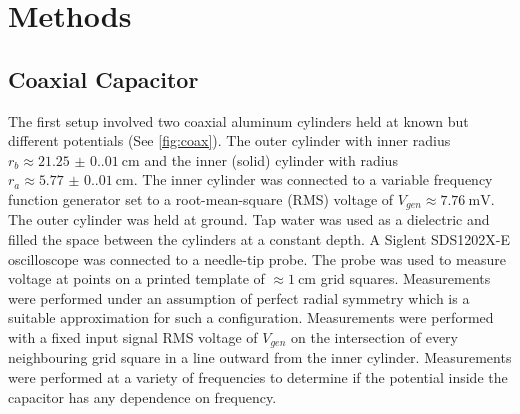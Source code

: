 \documentclass[10pt, twocolumn]{article}
\theoremstyle{definition}
\begin{document}
\section{Methods}
\subsection{Coaxial Capacitor}
The first setup involved two coaxial 
aluminum cylinders held at known but different potentials (See \ref{fig:coax}). The outer cylinder
with inner radius $r_b\approx\qty{21.25(0.01)}{\centi\meter}$ and the inner (solid) cylinder with radius
$r_a\approx\qty{5.77(0.01)}{\centi\meter}$. The inner cylinder was connected to a variable frequency
function generator set to a root-mean-square (RMS) voltage of $V_{gen}\approx\qty{7.76}{\milli\volt}$.
The outer cylinder was held at ground. Tap water was used as a dielectric and filled the space between the cylinders
at a constant depth.
A Siglent SDS1202X-E oscilloscope was connected to a needle-tip probe. The probe was
used to measure voltage at points on a printed template of $\approx\qty{1}{\centi\meter}$ grid squares.
Measurements were performed under an assumption of perfect radial symmetry
which is a suitable approximation for such a configuration. Measurements
were performed with a fixed input signal RMS voltage of $V_{gen}$ on the intersection of
every neighbouring grid square in a line outward from the inner cylinder. Measurements
were performed at a variety of frequencies to determine if the potential inside the capacitor
has any dependence on frequency.
\end{document}
